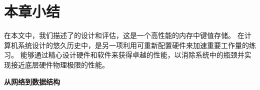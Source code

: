 \section{本章小结}
\label{kvdirect:sec:conclusion}


在本文中，我们描述了\oursys {}的设计和评估，这是一个高性能的内存中键值存储。 在计算机系统设计的悠久历史中，\oursys {}是另一项利用可重新配置硬件来加速重要工作量的练习。 \oursys {}能够通过精心设计硬件和软件来获得卓越的性能，以消除系统中的瓶颈并实现接近底层硬件物理极限的性能。


\textbf{从网络到数据结构}